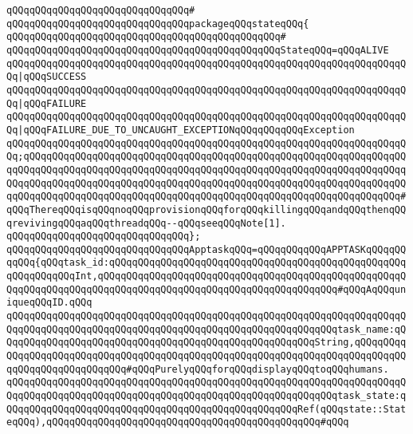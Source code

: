 \verb|qQQqqQQqqQQqqQQqqQQqqQQqqQQqqQQq#|\newline
\verb|qQQqqQQqqQQqqQQqqQQqqQQqqQQqqQQqpackageqQQqstateqQQq{|\newline
\verb|qQQqqQQqqQQqqQQqqQQqqQQqqQQqqQQqqQQqqQQqqQQqqQQq#|\newline
\verb|qQQqqQQqqQQqqQQqqQQqqQQqqQQqqQQqqQQqqQQqqQQqqQQqStateqQQq=qQQqALIVE|\newline
\verb|qQQqqQQqqQQqqQQqqQQqqQQqqQQqqQQqqQQqqQQqqQQqqQQqqQQqqQQqqQQqqQQqqQQqqQQq|\verb#|qQQqSUCCESS#\newline
\verb|qQQqqQQqqQQqqQQqqQQqqQQqqQQqqQQqqQQqqQQqqQQqqQQqqQQqqQQqqQQqqQQqqQQqqQQq|\verb#|qQQqFAILURE#\newline
\verb|qQQqqQQqqQQqqQQqqQQqqQQqqQQqqQQqqQQqqQQqqQQqqQQqqQQqqQQqqQQqqQQqqQQqqQQq|\verb#|qQQqFAILURE_DUE_TO_UNCAUGHT_EXCEPTIONqQQqqQQqqQQqException#\newline
\verb|qQQqqQQqqQQqqQQqqQQqqQQqqQQqqQQqqQQqqQQqqQQqqQQqqQQqqQQqqQQqqQQqqQQqqQQq;qQQqqQQqqQQqqQQqqQQqqQQqqQQqqQQqqQQqqQQqqQQqqQQqqQQqqQQqqQQqqQQqqQQqqQQqqQQqqQQqqQQqqQQqqQQqqQQqqQQqqQQqqQQqqQQqqQQqqQQqqQQqqQQqqQQqqQQqqQQqqQQqqQQqqQQqqQQqqQQqqQQqqQQqqQQqqQQqqQQqqQQqqQQqqQQqqQQqqQQqqQQqqQQqqQQqqQQqqQQqqQQqqQQqqQQqqQQqqQQqqQQqqQQqqQQqqQQqqQQqqQQqqQQqqQQqqQQq#qQQqThereqQQqisqQQqnoqQQqprovisionqQQqforqQQqkillingqQQqandqQQqthenqQQqrevivingqQQqaqQQqthreadqQQq--qQQqseeqQQqNote[1].|\newline
\verb|qQQqqQQqqQQqqQQqqQQqqQQqqQQqqQQq};|\newline
\newline
\verb|qQQqqQQqqQQqqQQqqQQqqQQqqQQqqQQqApptaskqQQq=qQQqqQQqqQQqAPPTASKqQQqqQQqqQQq{qQQqtask_id:qQQqqQQqqQQqqQQqqQQqqQQqqQQqqQQqqQQqqQQqqQQqqQQqqQQqqQQqqQQqqQQqInt,qQQqqQQqqQQqqQQqqQQqqQQqqQQqqQQqqQQqqQQqqQQqqQQqqQQqqQQqqQQqqQQqqQQqqQQqqQQqqQQqqQQqqQQqqQQqqQQqqQQqqQQqqQQqqQQq#qQQqAqQQquniqueqQQqID.qQQq|\newline
\verb|qQQqqQQqqQQqqQQqqQQqqQQqqQQqqQQqqQQqqQQqqQQqqQQqqQQqqQQqqQQqqQQqqQQqqQQqqQQqqQQqqQQqqQQqqQQqqQQqqQQqqQQqqQQqqQQqqQQqqQQqqQQqqQQqtask_name:qQQqqQQqqQQqqQQqqQQqqQQqqQQqqQQqqQQqqQQqqQQqqQQqqQQqqQQqString,qQQqqQQqqQQqqQQqqQQqqQQqqQQqqQQqqQQqqQQqqQQqqQQqqQQqqQQqqQQqqQQqqQQqqQQqqQQqqQQqqQQqqQQqqQQqqQQqqQQq#qQQqPurelyqQQqforqQQqdisplayqQQqtoqQQqhumans.|\newline
\newline
\verb|qQQqqQQqqQQqqQQqqQQqqQQqqQQqqQQqqQQqqQQqqQQqqQQqqQQqqQQqqQQqqQQqqQQqqQQqqQQqqQQqqQQqqQQqqQQqqQQqqQQqqQQqqQQqqQQqqQQqqQQqqQQqqQQqtask_state:qQQqqQQqqQQqqQQqqQQqqQQqqQQqqQQqqQQqqQQqqQQqqQQqqQQqRef(qQQqstate::StateqQQq),qQQqqQQqqQQqqQQqqQQqqQQqqQQqqQQqqQQqqQQqqQQqqQQq#qQQq|\newline
